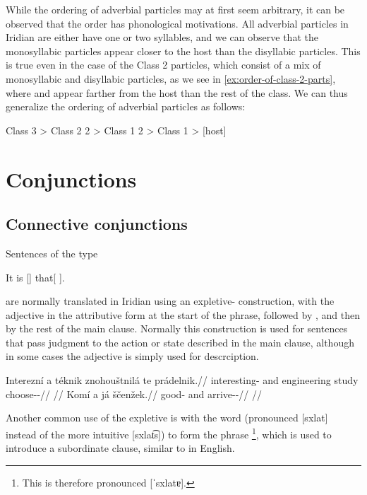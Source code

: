 While the ordering of adverbial particles may at first seem arbitrary, it can be
observed that the order has phonological motivations. All adverbial particles in
Iridian are either have one or two syllables, and we can observe that the
monosyllabic particles appear closer to the host than the disyllabic particles.
This is true even in the case of the Class 2 particles, which consist of a mix
of monosyllabic and disyllabic particles, as we see in
\ref{ex:order-of-class-2-parts}, where  and  appear farther
from the host than the rest of the class. We can thus generalize the ordering of
adverbial particles as follows:

\pex
	{\small
		Class 3 > Class 2 2\sigma{} > Class 1 2\sigma{} > Class 1 > [{\sc host}]
	}
\xe

\section{Conjunctions}\label{sec:conj}

\subsection{Connective conjunctions}\label{sec:conn-conj}

Sentences of the type

\ex
It is [] that[ ].
\xe

are normally translated in Iridian using an expletive- construction, with the adjective in the attributive form at the start of the phrase, followed by , and then by the rest of the main clause. Normally this construction is used for sentences that pass judgment to the action or state described in the main clause, although in some cases the adjective is simply used for descrciption.

\pex
\begingl
    \gla Interezní a téknik znohouštnilá te prádelnik.//
    \glb interesting-\Att{} and engineering study  choose-\Pv{}-\Pf{}//
    \glft {}//
\endgl
\xe
\pex
\begingl
    \gla Komí a já ščenžek.//
    \glb good-\Att{} and \Second{}\Sg{} arrive-\Av{}-\Pf{}//
    \glft {}//
\endgl
\xe

Another common use of the expletive  is with the word  (pronounced [sxlat] instead of the more intuitive [sxlat͡s]) to form the phrase \footnote{This is therefore pronounced [ˈsxlatɐ].}, which is used to introduce a subordinate clause, similar to  in English.

